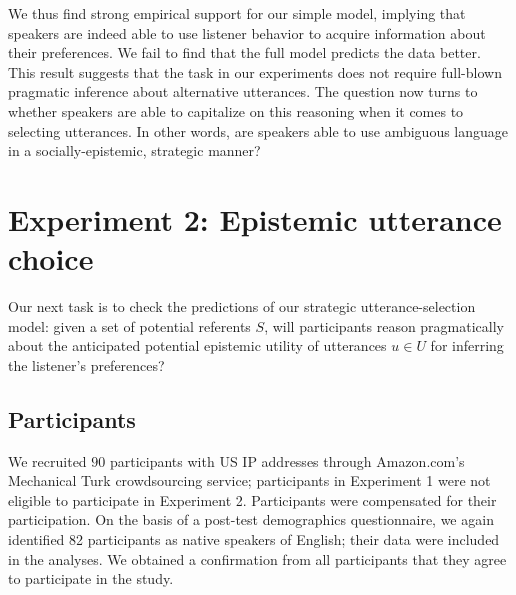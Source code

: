 \documentclass[11pt,a4paper]{article}
\begin{document}
We thus find strong empirical support for our simple model, implying that speakers are indeed able to use listener behavior to acquire information about their preferences.
We fail to find that the full model predicts the data better.
This result suggests that the task in our experiments does not require full-blown pragmatic inference about alternative utterances.
The question now turns to whether speakers are able to capitalize on this reasoning when it comes to selecting utterances. In other words, are speakers able to use ambiguous language in a socially-epistemic, strategic manner?



\section{Experiment 2: Epistemic utterance choice} \label{experiment2}
Our next task is to check the predictions of our strategic utterance-selection model: given a set of potential referents $S$, will participants reason pragmatically about the anticipated potential epistemic utility of utterances $u\in U$ for inferring the listener's preferences? 
%


\subsection{Participants}

We recruited $90$ participants with US IP addresses through Amazon.com's Mechanical Turk crowdsourcing service; participants in Experiment 1 were not eligible to participate in Experiment 2. Participants were compensated for their participation. On the basis of a post-test demographics questionnaire, we again identified 82 participants as native speakers of English; their data were included in the analyses. We obtained a confirmation from all participants that they agree to participate in the study.
\end{document}
